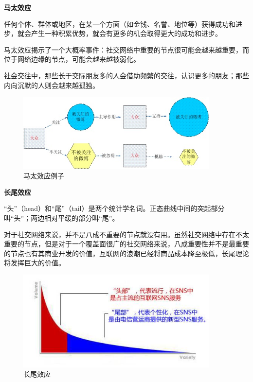 \begin{frame}
	\textbf{马太效应}
	
	任何个体、群体或地区，在某一个方面（如金钱、名誉、地位等）获得成功和进步，就会产生一种积累优势，就会有更多的机会取得更大的成功和进步。
	
	马太效应揭示了一个大概率事件：社交网络中重要的节点很可能会越来越重要，而位于网络边缘的节点，可能会越来越被弱化。
	
	社会交往中，那些长于交际朋友多的人会借助频繁的交往，认识更多的朋友；那些内向沉默的人则会越来越孤独。
	
\end{frame}

\begin{frame}

	\begin{figure}[htbp]
		\centering
		\includegraphics[width=0.9\textwidth]{pic/t6.jpg}
		\caption{马太效应例子}
	\end{figure}

\end{frame}

\begin{frame}
	\textbf{长尾效应}
	
	“头”（head）和“尾”（tail）是两个统计学名词。正态曲线中间的突起部分叫“头”；两边相对平缓的部分叫“尾”。
	
	对于社交网络来说，并不是八成不重要的节点就没有用。虽然社交网络中存在不太重要的节点，但是对于一个覆盖面很广的社交网络来说，八成重要性并不是最重要的节点也有其商业开发的价值，互联网的浪潮已经将商品成本降至极低，长尾理论将发挥巨大的价值。
	
\end{frame}

\begin{frame}

	\begin{figure}[htbp]
		\centering
		\includegraphics[width=0.9\textwidth]{pic/t7.jpg}
		\caption{长尾效应}
	\end{figure}

\end{frame}

